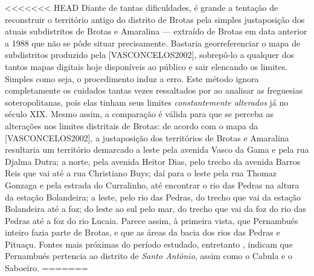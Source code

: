 <<<<<<< HEAD
Diante de tantas dificuldades, é grande a tentação de reconstruir o território antigo do distrito de Brotas pela simples justaposição dos atuais subdistritos de Brotas e Amaralina --- extraído de Brotas em data anterior a 1988 que não se pôde situar precisamente. Bastaria georreferenciar o mapa de subdistritos produzido pela [VASCONCELOS2002], sobrepô-lo a qualquer dos tantos mapas digitais hoje disponíveis ao público e sair elencando os limites. Simples como seja, o procedimento induz a erro. Este método ignora completamente os cuidados tantas vezes ressaltados por  ao analisar as freguesias soteropolitanas, pois elas tinham seus limites \textit{constantemente alterados} já no século XIX. Mesmo assim, a comparação é válida para que se perceba as alterações nos limites distritais de Brotas: de acordo com o mapa da [VASCONCELOS2002], a justaposição dos territórios de Brotas e Amaralina resultaria um território demarcado a leste pela avenida Vasco da Gama e pela rua Djalma Dutra; a norte, pela avenida Heitor Dias, pelo trecho da avenida Barros Reis que vai até a rua Christiano Buys; daí para o leste pela rua Thomaz Gonzaga e pela estrada do Curralinho, até encontrar o rio das Pedras na altura da estação Bolandeira; a leste, pelo rio das Pedras, do trecho que vai da estação Bolandeira até a foz; do leste ao sul pelo mar, do trecho que vai da foz do rio das Pedras até a foz do rio Lucaia. Parece assim, à primeira vista, que Pernambués inteiro fazia parte de Brotas, e que as áreas da bacia dos rios das Pedras e Pituaçu. Fontes mais próximas do período estudado, entretanto \cite{souza_guia_1935}, indicam que Pernambués pertencia ao distrito de \textit{Santo Antônio}, assim como o Cabula e o Saboeiro.
=======
